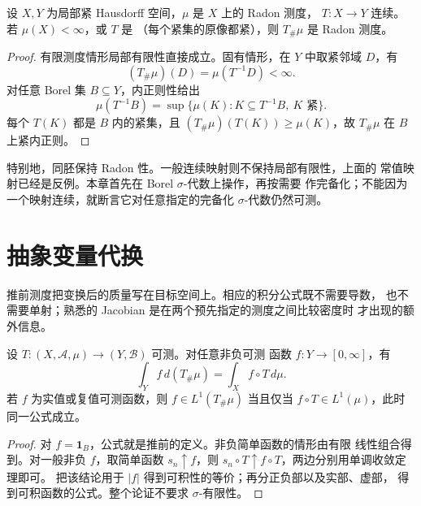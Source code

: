 \begin{proposition}
\label{prop:proper-pushforward-radon}
设 $X,Y$ 为局部紧 Hausdorff 空间，$\mu$ 是 $X$ 上的 Radon 测度，
$T:X\to Y$ 连续。若 $\mu(X)<\infty$，或 $T$ 是
（每个紧集的原像都紧），则 $T_\#\mu$ 是 Radon 测度。
\end{proposition}

\begin{proof}
有限测度情形局部有限性直接成立。固有情形，在 $Y$ 中取紧邻域 $D$，有
\[
 (T_\#\mu)(D)=\mu(T^{-1}D)<\infty.
\]
对任意 Borel 集 $B\subseteq Y$，内正则性给出
\[
 \mu(T^{-1}B)=\sup\{\mu(K):K\subseteq T^{-1}B,\ K\text{ 紧}\}.
\]
每个 $T(K)$ 都是 $B$ 内的紧集，且
$(T_\#\mu)(T(K))\ge\mu(K)$，故 $T_\#\mu$ 在 $B$ 上紧内正则。
\end{proof}

特别地，同胚保持 Radon 性。一般连续映射则不保持局部有限性，上面的
常值映射已经是反例。本章首先在 Borel $\sigma$-代数上操作，再按需要
作完备化；不能因为一个映射连续，就断言它对任意指定的完备化
$\sigma$-代数仍然可测。

\section{抽象变量代换}
\label{sec:abstract-change-of-variables}

推前测度把变换后的质量写在目标空间上。相应的积分公式既不需要导数，
也不需要单射；熟悉的 Jacobian 是在两个预先指定的测度之间比较密度时
才出现的额外信息。

\begin{theorem}[推前积分公式]
\label{thm:pushforward-integration}
设 $T:(X,\mathcal A,\mu)\to(Y,\mathcal B)$ 可测。对任意非负可测
函数 $f:Y\to[0,\infty]$，有
\begin{equation}
 \int_Yf\,d(T_\#\mu)=\int_X f\circ T\,d\mu.
 \label{eq:pushforward-integration}
\end{equation}
若 $f$ 为实值或复值可测函数，则 $f\in L^1(T_\#\mu)$ 当且仅当
$f\circ T\in L^1(\mu)$，此时同一公式成立。
\end{theorem}

\begin{proof}
对 $f=\mathbf1_B$，公式就是推前的定义。非负简单函数的情形由有限
线性组合得到。对一般非负 $f$，取简单函数 $s_n\uparrow f$，则
$s_n\circ T\uparrow f\circ T$，两边分别用单调收敛定理即可。
把该结论用于 $|f|$ 得到可积性的等价；再分正负部以及实部、虚部，
得到可积函数的公式。整个论证不要求 $\sigma$-有限性。
\end{proof}

